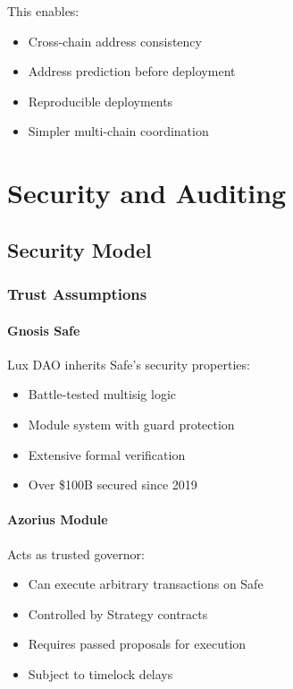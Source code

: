 \documentclass[11pt,a4paper]{article}
\begin{document}
This enables:
\begin{itemize}
    \item Cross-chain address consistency
    \item Address prediction before deployment
    \item Reproducible deployments
    \item Simpler multi-chain coordination
\end{itemize}

\section{Security and Auditing}

\subsection{Security Model}

\subsubsection{Trust Assumptions}

\paragraph{Gnosis Safe} Lux DAO inherits Safe's security properties:
\begin{itemize}
    \item Battle-tested multisig logic
    \item Module system with guard protection
    \item Extensive formal verification
    \item Over \$100B secured since 2019
\end{itemize}

\paragraph{Azorius Module} Acts as trusted governor:
\begin{itemize}
    \item Can execute arbitrary transactions on Safe
    \item Controlled by Strategy contracts
    \item Requires passed proposals for execution
    \item Subject to timelock delays
\end{itemize}
\end{document}
